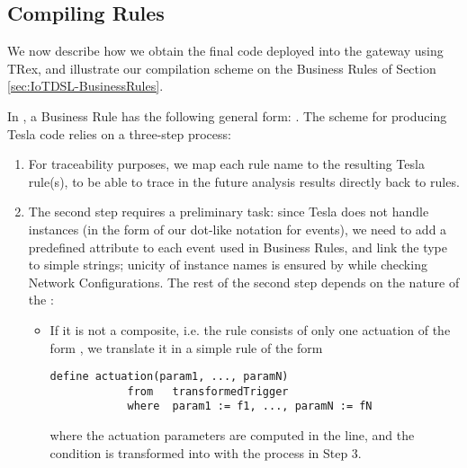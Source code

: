 \subsection{Compiling \IOTDSL Rules}
\label{sec:CG-Compilation}

We now describe how we obtain the final code deployed into the gateway using TRex, and illustrate our compilation scheme on the Business Rules of Section \ref{sec:IoTDSL-BusinessRules}.

In \IOTDSL, a Business Rule has the following general form: . The scheme for producing Tesla code relies on a three-step process:
\begin{enumerate}
	\item For traceability purposes, we map each rule name  to the resulting Tesla rule(s), to be able to trace in the future analysis results directly back to \IOTDSL rules.
	
	\item The second step requires a preliminary task: since Tesla does not handle instances (in the form of our dot-like notation for events), we need to add a predefined attribute  to each event  used in \IOTDSL Business Rules, and link the type  to simple strings; unicity of instance names is ensured by \IOTDSL while checking Network Configurations. The rest of the second step depends on the nature of the :
	\begin{itemize}
		\item If it is not a composite, i.e. the rule consists of only one actuation of the form , we translate it in a simple rule of the form
		\begin{lstlisting}[language=tesla, numbers=none]
			define actuation(param1, ..., paramN)
			from   transformedTrigger
			where  param1 := f1, ..., paramN := fN
		\end{lstlisting}
		where the actuation parameters are computed in the  line, and the  condition is transformed into  with the process in Step 3.
		

\end{itemize}
\end{enumerate}
